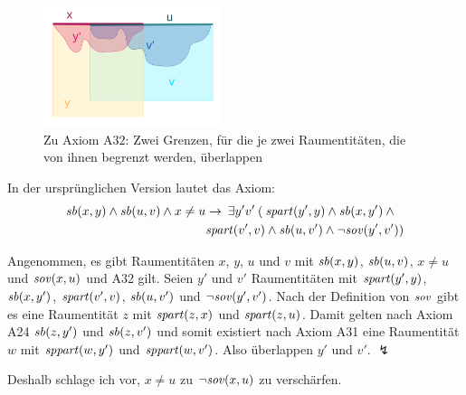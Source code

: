     \begin{figure}[ht]
        \centering
        \includegraphics[height=3.5cm]{abb/a32.png}
        \caption[Zu Axiom 32]{Zu Axiom A32: Zwei Grenzen, für die je zwei Raumentitäten, die von ihnen begrenzt werden, überlappen}
        \label{fig:a32}
    \end{figure}
    
    In der ursprünglichen Version lautet das Axiom:
    \begin{align*}
        \mathit{sb}(x,y) \land \mathit{sb}(u,v) \land x\neq u &\to\: 
        \exists y'v'\:(\: \mathit{spart}(y',y) \land \mathit{sb}(x,y') 
        \land \mbox{} \\
        &\mathit{spart}(v',v) 
        \land \mathit{sb}(u,v') \land \neg \mathit{sov}(y',v'))
    \end{align*}

    
    Angenommen, es gibt Raumentitäten $x$, $y$, $u$ und $v$ mit $\mathit{sb}(x,y)$, $\mathit{sb}(u,v)$, $x \neq u$ und $\mathit{sov}(x,u)$ und A32 gilt.
    Seien $y'$ und $v'$ Raumentitäten mit $\mathit{spart}(y',y)$, $\mathit{sb}(x,y')$, $\mathit{spart}(v',v)$, $\mathit{sb}(u,v')$ und $\neg \mathit{sov}(y',v')$.
    Nach der Definition von $\mathit{sov}$ gibt es eine Raumentität $z$ mit $\mathit{spart}(z,x)$ und $\mathit{spart}(z,u)$.
    Damit gelten nach Axiom A24
    $\mathit{sb}(z,y')$ und $\mathit{sb}(z,v')$ und somit existiert nach Axiom A31 eine Raumentität $w$ mit $\mathit{sppart}(w,y')$ und $\mathit{sppart}(w,v')$.
    Also überlappen $y'$ und $v'$. $\lightning$
    
    Deshalb schlage ich vor, $x \neq u$ zu $\neg \mathit{sov}(x,u)$ zu verschärfen.
% 
% 				

